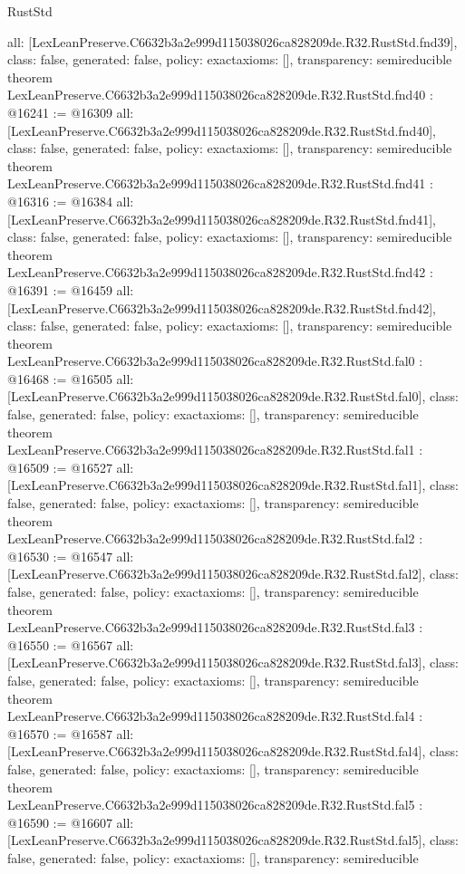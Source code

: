 \begin{lexlean}{RustStd}
\begin{coremodule}
{  all: [LexLeanPreserve.C6632b3a2e999d115038026ca828209de.R32.RustStd.fnd39],
  class: false,
  generated: false,
  policy: exact{axioms: []},
  transparency: semireducible
}
theorem LexLeanPreserve.C6632b3a2e999d115038026ca828209de.R32.RustStd.fnd40 : @16241 := @16309 {
  all: [LexLeanPreserve.C6632b3a2e999d115038026ca828209de.R32.RustStd.fnd40],
  class: false,
  generated: false,
  policy: exact{axioms: []},
  transparency: semireducible
}
theorem LexLeanPreserve.C6632b3a2e999d115038026ca828209de.R32.RustStd.fnd41 : @16316 := @16384 {
  all: [LexLeanPreserve.C6632b3a2e999d115038026ca828209de.R32.RustStd.fnd41],
  class: false,
  generated: false,
  policy: exact{axioms: []},
  transparency: semireducible
}
theorem LexLeanPreserve.C6632b3a2e999d115038026ca828209de.R32.RustStd.fnd42 : @16391 := @16459 {
  all: [LexLeanPreserve.C6632b3a2e999d115038026ca828209de.R32.RustStd.fnd42],
  class: false,
  generated: false,
  policy: exact{axioms: []},
  transparency: semireducible
}
theorem LexLeanPreserve.C6632b3a2e999d115038026ca828209de.R32.RustStd.fal0 : @16468 := @16505 {
  all: [LexLeanPreserve.C6632b3a2e999d115038026ca828209de.R32.RustStd.fal0],
  class: false,
  generated: false,
  policy: exact{axioms: []},
  transparency: semireducible
}
theorem LexLeanPreserve.C6632b3a2e999d115038026ca828209de.R32.RustStd.fal1 : @16509 := @16527 {
  all: [LexLeanPreserve.C6632b3a2e999d115038026ca828209de.R32.RustStd.fal1],
  class: false,
  generated: false,
  policy: exact{axioms: []},
  transparency: semireducible
}
theorem LexLeanPreserve.C6632b3a2e999d115038026ca828209de.R32.RustStd.fal2 : @16530 := @16547 {
  all: [LexLeanPreserve.C6632b3a2e999d115038026ca828209de.R32.RustStd.fal2],
  class: false,
  generated: false,
  policy: exact{axioms: []},
  transparency: semireducible
}
theorem LexLeanPreserve.C6632b3a2e999d115038026ca828209de.R32.RustStd.fal3 : @16550 := @16567 {
  all: [LexLeanPreserve.C6632b3a2e999d115038026ca828209de.R32.RustStd.fal3],
  class: false,
  generated: false,
  policy: exact{axioms: []},
  transparency: semireducible
}
theorem LexLeanPreserve.C6632b3a2e999d115038026ca828209de.R32.RustStd.fal4 : @16570 := @16587 {
  all: [LexLeanPreserve.C6632b3a2e999d115038026ca828209de.R32.RustStd.fal4],
  class: false,
  generated: false,
  policy: exact{axioms: []},
  transparency: semireducible
}
theorem LexLeanPreserve.C6632b3a2e999d115038026ca828209de.R32.RustStd.fal5 : @16590 := @16607 {
  all: [LexLeanPreserve.C6632b3a2e999d115038026ca828209de.R32.RustStd.fal5],
  class: false,
  generated: false,
  policy: exact{axioms: []},
  transparency: semireducible
}
\end{coremodule}
\end{lexlean}
